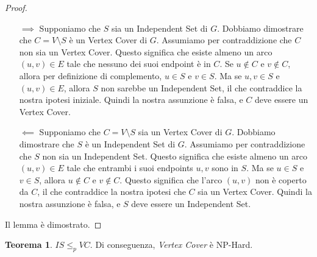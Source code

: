 \documentclass[a4paper]{article}
\theoremstyle{definition} %
\newtheorem{theorem}{Teorema}
[section]
\theoremstyle{definition} %
\begin{document}
\begin{proof}
\begin{itemize}
    \item[$\implies$] Supponiamo che $S$ sia un Independent Set di $G$.
    Dobbiamo dimostrare che $C = V \setminus S$ è un Vertex Cover di $G$.
    Assumiamo per contraddizione che $C$ non sia un Vertex Cover. Questo significa che esiste almeno un arco $(u, v) \in E$ tale che nessuno dei suoi endpoint è in $C$. Se $u \notin C$ e $v \notin C$, allora per definizione di complemento, $u \in S$ e $v \in S$. Ma se $u, v \in S$ e $(u, v) \in E$, allora $S$ non sarebbe un Independent Set, il che contraddice la nostra ipotesi iniziale. Quindi la nostra assunzione è falsa, e $C$ deve essere un Vertex Cover.

    \item[$\impliedby$] Supponiamo che $C = V \setminus S$ sia un Vertex Cover di $G$.
    Dobbiamo dimostrare che $S$ è un Independent Set di $G$.
    Assumiamo per contraddizione che $S$ non sia un Independent Set. Questo significa che esiste almeno un arco $(u, v) \in E$ tale che entrambi i suoi endpoints $u, v$ sono in $S$. Ma se $u \in S$ e $v \in S$, allora $u \notin C$ e $v \notin C$. Questo significa che l'arco $(u, v)$ non è coperto da $C$, il che contraddice la nostra ipotesi che $C$ sia un Vertex Cover. Quindi la nostra assunzione è falsa, e $S$ deve essere un Independent Set.
\end{itemize}
Il lemma è dimostrato.
\end{proof}

\begin{theorem}
$IS \le_p VC$. Di conseguenza, \emph{Vertex Cover} è NP-Hard.
\end{theorem}
\end{document}
